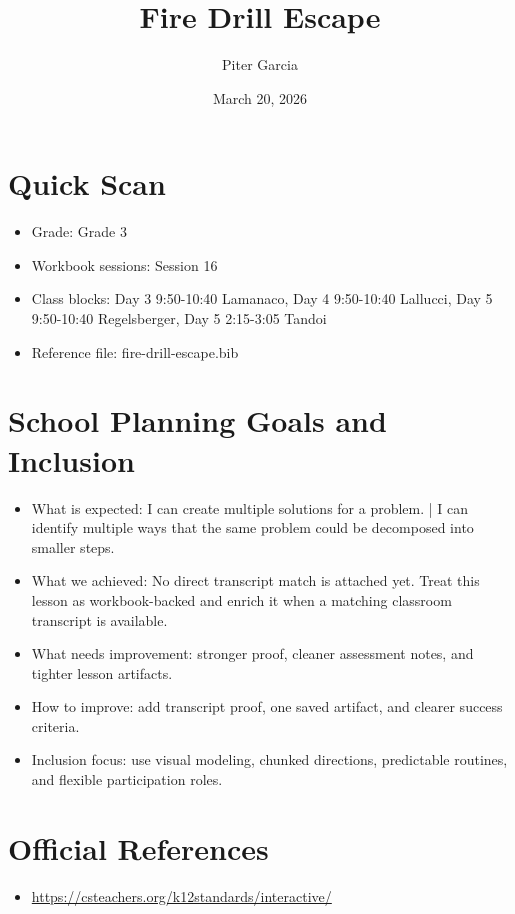 \documentclass[11pt]{article}
\title{Fire Drill Escape}
\author{Piter Garcia}
\date{March 20, 2026}
\begin{document}
\maketitle
\section*{Quick Scan}
\begin{itemize}[leftmargin=*]
\item Grade: Grade 3
\item Workbook sessions: Session 16
\item Class blocks: Day 3 9:50-10:40 Lamanaco, Day 4 9:50-10:40 Lallucci, Day 5 9:50-10:40 Regelsberger, Day 5 2:15-3:05 Tandoi
\item Reference file: fire-drill-escape.bib
\end{itemize}
\section*{School Planning Goals and Inclusion}
\begin{itemize}[leftmargin=*]
\item What is expected: I can create multiple solutions for a problem. | I can identify multiple ways that the same problem could be decomposed into smaller steps.
\item What we achieved: No direct transcript match is attached yet. Treat this lesson as workbook-backed and enrich it when a matching classroom transcript is available.
\item What needs improvement: stronger proof, cleaner assessment notes, and tighter lesson artifacts.
\item How to improve: add transcript proof, one saved artifact, and clearer success criteria.
\item Inclusion focus: use visual modeling, chunked directions, predictable routines, and flexible participation roles.
\end{itemize}
\section*{Official References}
\begin{itemize}[leftmargin=*]
\item \url{https://csteachers.org/k12standards/interactive/}

\end{itemize}
\end{document}
